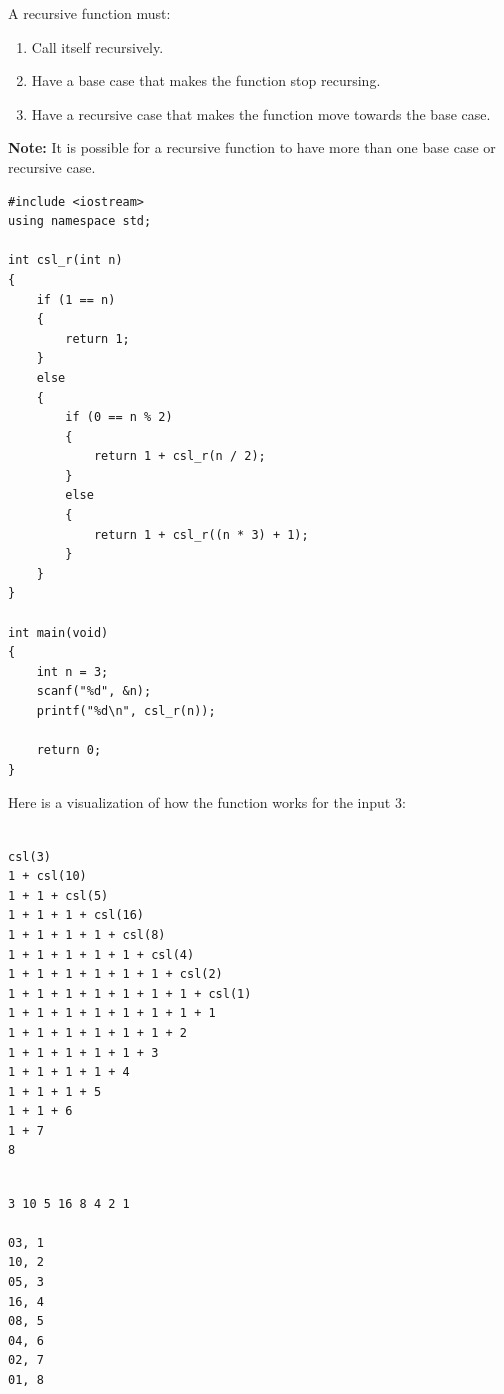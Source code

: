 \documentclass[12pt]{article}
\begin{document}
\noindent A recursive function must:

\begin{enumerate}
    \item Call itself recursively.
    \item Have a base case that makes the function stop recursing.
    \item Have a recursive case that makes the function move towards the base case.
\end{enumerate}

\noindent \textbf{Note:} It is possible for a recursive function to have more than one base case or recursive case. \\

\newpage

\begin{verbatim}
#include <iostream>
using namespace std;

int csl_r(int n)
{
    if (1 == n)
    {
        return 1;
    }
    else
    {
        if (0 == n % 2)
        {
            return 1 + csl_r(n / 2);
        }
        else
        {
            return 1 + csl_r((n * 3) + 1);
        }
    }
}

int main(void)
{
    int n = 3;
    scanf("%d", &n);
    printf("%d\n", csl_r(n));

    return 0;
}
\end{verbatim}

\newpage

\noindent Here is a visualization of how the function works for the input $3$:

\begin{verbatim}

csl(3)
1 + csl(10)
1 + 1 + csl(5)
1 + 1 + 1 + csl(16)
1 + 1 + 1 + 1 + csl(8)
1 + 1 + 1 + 1 + 1 + csl(4)
1 + 1 + 1 + 1 + 1 + 1 + csl(2)
1 + 1 + 1 + 1 + 1 + 1 + 1 + csl(1)
1 + 1 + 1 + 1 + 1 + 1 + 1 + 1
1 + 1 + 1 + 1 + 1 + 1 + 2
1 + 1 + 1 + 1 + 1 + 3
1 + 1 + 1 + 1 + 4
1 + 1 + 1 + 5
1 + 1 + 6
1 + 7
8

\end{verbatim}


\begin{verbatim}

3 10 5 16 8 4 2 1

03, 1
10, 2
05, 3
16, 4
08, 5
04, 6
02, 7
01, 8

\end{verbatim}
\end{document}
